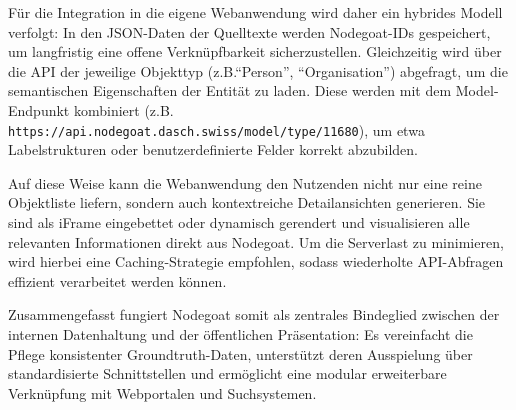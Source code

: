 \documentclass[12pt, a4paper, ngerman, bidi=default]{article}
\newcommand{\code}[1]{\colorbox{VeryLightGray}{\texttt{#1}}} %
\begin{document}
Für die Integration in die eigene Webanwendung wird daher ein hybrides Modell verfolgt: In den JSON-Daten der Quelltexte werden Nodegoat-IDs gespeichert, um langfristig eine offene Verknüpfbarkeit sicherzustellen. 
Gleichzeitig wird über die API der jeweilige Objekttyp (z.B.\enquote{Person}, \enquote{Organisation}) abgefragt, um die semantischen Eigenschaften der Entität zu laden. Diese werden mit dem 
Model-Endpunkt kombiniert (z.B. \code{https://api.nodegoat.dasch.swiss/model/type/11680}), um etwa Labelstrukturen oder benutzerdefinierte Felder korrekt abzubilden.

Auf diese Weise kann die Webanwendung den Nutzenden nicht nur eine reine Objektliste liefern, sondern auch kontextreiche Detailansichten generieren. Sie sind als iFrame eingebettet oder dynamisch 
gerendert und visualisieren alle relevanten Informationen direkt aus Nodegoat. Um die Serverlast zu minimieren, wird hierbei eine Caching-Strategie empfohlen, sodass wiederholte API-Abfragen 
effizient verarbeitet werden können.

Zusammengefasst fungiert Nodegoat somit als zentrales Bindeglied zwischen der internen Datenhaltung und der öffentlichen Präsentation: Es vereinfacht die Pflege konsistenter Groundtruth-Daten, 
unterstützt deren Ausspielung über standardisierte Schnittstellen und ermöglicht eine modular erweiterbare Verknüpfung mit Webportalen und Suchsystemen.






\end{document}
